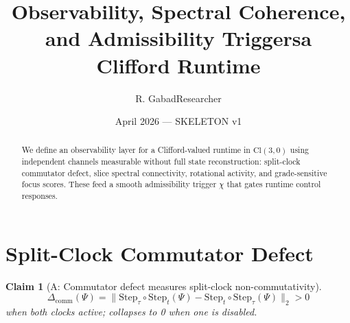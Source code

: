 \documentclass[11pt,a4paper]{article}
\title{\textbf{Observability, Spectral Coherence, and Admissibility Triggers\in a Clifford Runtime}}
\author{R. Gabad\Independent Researcher}
\date{April 2026 --- SKELETON v1}
\newtheorem{claim}{Claim}
\begin{document}
\maketitle

\begin{abstract}
We define an observability layer for a Clifford-valued runtime in
\(\mathrm{Cl}(3,0)\) using independent channels measurable without full state
reconstruction: split-clock commutator defect, slice spectral connectivity,
rotational activity, and grade-sensitive focus scores. These feed a smooth
admissibility trigger \(\chi\) that gates runtime control responses.
\end{abstract}

\section{Split-Clock Commutator Defect}

\begin{claim}[A: Commutator defect measures split-clock non-commutativity]
\[
  \Delta_{\mathrm{comm}}(\Psi) = \|\mathrm{Step}_\tau \circ \mathrm{Step}_t(\Psi)
  - \mathrm{Step}_t \circ \mathrm{Step}_\tau(\Psi)\|_2 > 0
\]
when both clocks active; collapses to 0 when one is disabled.
\end{claim}
\end{document}

